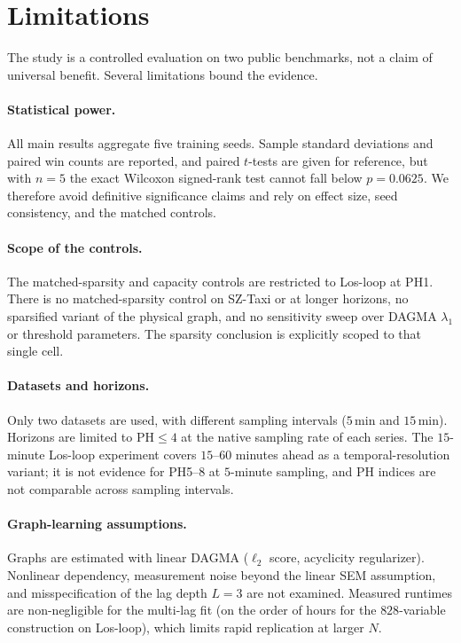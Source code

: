 \section{Limitations}\label{sec:limitations}

The study is a controlled evaluation on two public benchmarks, not a claim of
universal benefit. Several limitations bound the evidence.

\paragraph{Statistical power.}
All main results aggregate five training seeds. Sample standard deviations
and paired win counts are reported, and paired $t$-tests are given for
reference, but with $n=5$ the exact Wilcoxon signed-rank test cannot fall
below $p=0.0625$. We therefore avoid definitive significance claims and rely
on effect size, seed consistency, and the matched controls.

\paragraph{Scope of the controls.}
The matched-sparsity and capacity controls are restricted to Los-loop at
PH1. There is no matched-sparsity control on SZ-Taxi or at longer horizons,
no sparsified variant of the physical graph, and no sensitivity sweep over
DAGMA $\lambda_1$ or threshold parameters. The sparsity conclusion is
explicitly scoped to that single cell.

\paragraph{Datasets and horizons.}
Only two datasets are used, with different sampling intervals
($5$\,min and $15$\,min). Horizons are limited to $\mathrm{PH}\le 4$ at the
native sampling rate of each series. The $15$-minute Los-loop experiment
covers $15$--$60$ minutes ahead as a temporal-resolution variant; it is not
evidence for PH5--8 at $5$-minute sampling, and PH indices are not
comparable across sampling intervals.

\paragraph{Graph-learning assumptions.}
Graphs are estimated with linear DAGMA ($\ell_2$ score, acyclicity
regularizer). Nonlinear dependency, measurement noise beyond the linear SEM
assumption, and misspecification of the lag depth $L=3$ are not examined.
Measured runtimes are non-negligible for the multi-lag fit (on the order of
hours for the $828$-variable construction on Los-loop), which limits rapid
replication at larger $N$.

